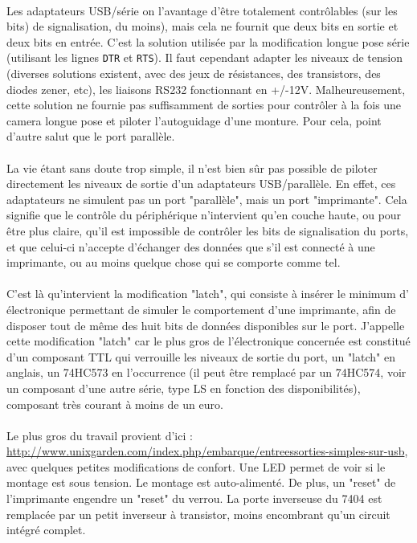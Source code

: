 \documentclass[11pt,a4paper]{book}
\begin{document}
\paragraph*{}
Les adaptateurs USB/s\'erie on l'avantage d'\^etre totalement contr\^olables (sur les bits)
de signalisation, du moins), mais cela ne fournit que deux bits en sortie et deux bits en
entr\'ee. C'est la solution utilis\'ee par la modification longue pose s\'erie (utilisant
les lignes {\tt DTR} et {\tt RTS}). Il faut cependant adapter les niveaux de tension 
(diverses solutions existent, avec des jeux de r\'esistances, des transistors, des diodes
 zener, etc), les liaisons RS232
 fonctionnant en +/-12V. Malheureusement, cette solution ne fournie pas suffisamment de 
 sorties pour contr\^oler \`a la fois une camera longue pose et piloter l'autoguidage d'une
 monture. Pour cela, point d'autre salut que le port parall\`ele.

\paragraph*{} 
La vie \'etant sans doute trop simple, il n'est bien s\^ur pas possible de piloter directement
les niveaux de sortie d'un adaptateurs USB/parall\`ele. En effet, ces adaptateurs ne simulent pas
un port "parall\`ele", mais un port "imprimante". Cela signifie que le contr\^ole du p\'eriph\'erique
n'intervient qu'en couche haute, ou pour \^etre plus claire, qu'il est impossible de contr\^oler 
les bits de signalisation du ports, et que celui-ci n'accepte d'\'echanger des donn\'ees que
s'il est connect\'e \`a une imprimante, ou au moins quelque chose qui se comporte comme tel.

\paragraph*{}
C'est l\`a qu'intervient la modification "latch", qui consiste \`a ins\'erer le minimum d'
\'electronique permettant de simuler le comportement d'une imprimante, afin de disposer tout
de m\^eme des huit bits de donn\'ees disponibles sur le port. J'appelle cette modification
"latch" car le plus gros de l'\'electronique concern\'ee est constitu\'e d'un composant TTL qui
verrouille les niveaux de sortie du port, un "latch" en anglais, un 74HC573 en l'occurrence (il 
peut \^etre remplac\'e par un 74HC574, voir un composant d'une autre s\'erie, type LS en fonction
 des disponibilit\'es), composant tr\`es courant \`a moins de un euro.

\paragraph*{}
Le plus gros du travail provient d'ici : \url{http://www.unixgarden.com/index.php/embarque/entreessorties-simples-sur-usb}, 
avec quelques petites modifications de confort. Une LED permet de voir si le montage est sous tension. Le 
montage est auto-aliment\'e. De plus, un "reset" de l'imprimante engendre un "reset" du
verrou. La porte inverseuse du 7404 est remplac\'ee par un petit inverseur \`a transistor, moins 
encombrant qu'un circuit int\'egr\'e complet.
\end{document}
